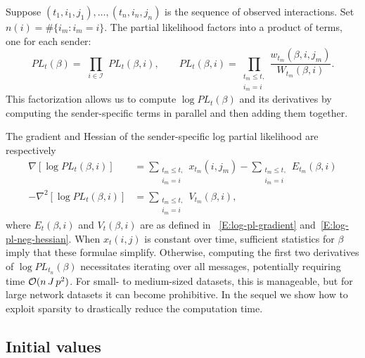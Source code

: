 \documentclass[final]{statsoc}
\begin{document}
Suppose $(t_1, i_1, j_1), \ldots, (t_n, i_n, j_n)$ is the sequence of observed
interactions.  Set $n(i) = \#\{ i_m : i_m = i \}.$
The partial likelihood factors into a product of terms, one for each sender:
\begin{equation*}
    \mathit{PL}_t(\beta)
        =
        \,\,
        \prod_{i \in \mathcal{I}}
            \,\,
            \mathit{PL}_t(\beta, i),
    \qquad
    \mathit{PL}_t(\beta, i)
        =
        \!\!\!\!
        \prod_{\substack{t_m \leq t, \\ i_m = i}}
            \!\!\!
            \frac{w_{t_m} (\beta, i, j_m)}
                 {W_{t_m}(\beta, i)}.
\end{equation*}
This factorization allows us to compute $\log \mathit{PL}_t(\beta)$ and
its derivatives by computing the sender-specific terms in parallel and
then adding them together.

The gradient and Hessian of the sender-specific log partial likelihood
are respectively
\begin{subequations}
\begin{align}\label{eq:grad-MPLE}
    \nabla [ \log \mathit{PL}_t(\beta, i) ]
        & =
        \sum_{\substack{t_m \leq t, \\ i_m = i}}
            x_{t_m}\!(i,j_m)
            -\!\!
            \sum_{\substack{t_m \leq t, \\ i_m = i}}
                E_{t_m}(\beta, i) \\
    -\nabla^2 [ \log \mathit{PL}_t(\beta, i) ]
        & =
        \sum_{\substack{t_m \leq t, \\ i_m = i}}
          V_{t_m}(\beta, i),\label{eq:hess-MPLE}
\end{align}
\end{subequations}
where $E_{t}(\beta,i)$ and $V_{t}(\beta, i)$ are as defined in
~\eqref{E:log-pl-gradient} and~\eqref{E:log-pl-neg-hessian}.
When $x_t(i,j)$ is constant over time, sufficient statistics for $\beta$ imply that these formulae simplify.
Otherwise, computing the first two derivatives of
$\log \mathit{PL}_{t_n}(\beta)$
necessitates iterating over all messages, potentially requiring time
$\mathcal{O}(n \, J \, p^2)$.  For small- to medium-sized datasets, this is manageable,
but for large network datasets it can become
prohibitive.  In the sequel we show how to exploit sparsity to drastically
reduce the computation time.

\subsection{Initial values}
\end{document}
